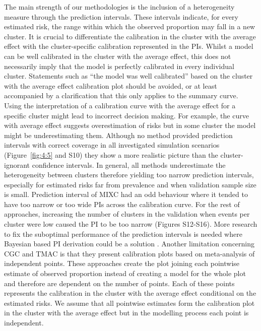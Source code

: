 The main strength of our methodologies is the inclusion of a heterogeneity measure through the prediction intervals. These intervals indicate, for every estimated risk, the range within which the observed proportion may fall in a new cluster. It is crucial to differentiate the calibration in the cluster with the average effect with the cluster-specific calibration represented in the \glspl{PI}. Whilst a model can be well calibrated in the cluster with the average effect, this does not necessarily imply that the model is perfectly calibrated in every individual cluster. Statements such as ``the model was well calibrated'' based on the cluster with the average effect calibration plot should be avoided, or at least accompanied by a clarification that this only applies to the summary curve. Using the interpretation of a calibration curve with the average effect for a specific cluster might lead to incorrect decision making. For example, the curve with average effect suggests overestimation of risks but in some cluster the model might be underestimating them. Although no method provided prediction intervals with correct coverage in all investigated simulation scenarios (Figure~\ref{fig:4:5} and S10) they show a more realistic picture than the cluster-ignorant confidence intervals. In general, all methods underestimate the heterogeneity between clusters therefore yielding too narrow prediction intervals, especially for estimated risks far from prevalence and when validation sample size is small. Prediction interval of \gls{MIXC} had an odd behaviour where it tended to have too narrow or too wide \glspl{PI} across the calibration curve. For the rest of approaches, increasing the number of clusters in the validation when events per cluster were low caused the \gls{PI} to be too narrow (Figures S12-S16). More research to fix the suboptimal performance of the prediction intervals is needed where Bayesian based \gls{PI} derivation could be a solution \cite{partlettRandomEffectsMetaanalysis2017,debrayFrameworkMetaanalysisPrediction2019,higginsReevaluationRandomeffectsMetaanalysis2009}. Another limitation concerning \gls{CGC} and \gls{TMAC} is that they present calibration plots based on meta-analysis of independent points. These approaches create the plot joining each pointwise estimate of observed proportion instead of creating a model for the whole plot and therefore are dependent on the number of points. Each of these points represents the calibration in the cluster with the average effect conditional on the estimated risks. We assume that all pointwise estimates form the calibration plot in the cluster with the average effect but in the modelling process each point is independent.

